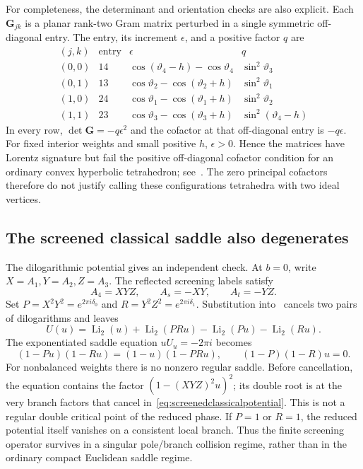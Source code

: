 \documentclass[11pt,a4paper]{article}
\numberwithin{equation}{section}
\theoremstyle{definition}
\theoremstyle{remark}
\begin{document}
For completeness, the determinant and orientation checks are
also explicit. Each $\mathbf G_{jk}$ is a planar rank-two
Gram matrix perturbed in a single symmetric off-diagonal entry.
The entry, its increment $\epsilon$, and a positive factor $q$
are
\[
\begin{array}{c|c|c|c}
(j,k)&\text{entry}&\epsilon&q\\ \hline
(0,0)&14&\cos(\vartheta_4-h)-\cos\vartheta_4&
                                      \sin^2\vartheta_3\\
(0,1)&13&\cos\vartheta_2-\cos(\vartheta_2+h)&
                                      \sin^2\vartheta_1\\
(1,0)&24&\cos\vartheta_1-\cos(\vartheta_1+h)&
                                      \sin^2\vartheta_2\\
(1,1)&23&\cos\vartheta_3-\cos(\vartheta_3+h)&
                                      \sin^2(\vartheta_4-h)
\end{array}
\]
In every row, $\det\mathbf G=-q\epsilon^2$ and the cofactor
at that off-diagonal entry is $-q\epsilon$. For fixed interior
weights and small positive $h$, $\epsilon>0$. Hence the matrices
have Lorentz signature but fail the positive off-diagonal
cofactor condition for an ordinary convex hyperbolic
tetrahedron; see~\cite[Theorem~2.1]{BellettiYang}.
The zero principal cofactors therefore do not justify calling
these configurations tetrahedra with two ideal vertices.

\subsection{The screened classical saddle also degenerates}

The dilogarithmic potential gives an independent check. At
$b=0$, write $X=A_1,Y=A_2,Z=A_3$. The reflected screening
labels satisfy
\[
 A_4=XYZ,\qquad A_s=-XY,\qquad A_t=-YZ.
\]
Set
$P=X^2Y^2=e^{2\pi i\delta_0}$ and
$R=Y^2Z^2=e^{2\pi i\delta_1}$.
Substitution into~\cite[eq.~(3.1)]{TeschnerVartanov} cancels
two pairs of dilogarithms and leaves
\begin{equation}
 U(u)=\operatorname{Li}_2(u)+\operatorname{Li}_2(PRu)
       -\operatorname{Li}_2(Pu)-\operatorname{Li}_2(Ru).
 \label{eq:screenedclassicalpotential}
\end{equation}
The exponentiated saddle equation $uU_u=-2\pi i$ becomes
\[
 (1-Pu)(1-Ru)=(1-u)(1-PRu),
 \qquad (1-P)(1-R)u=0.
\]
For nonbalanced weights there is no nonzero regular saddle.
Before cancellation, the equation contains the factor
$(1-(XYZ)^2u)^2$; its double root is at the very branch
factors that cancel in~\eqref{eq:screenedclassicalpotential}.
This is not a regular double critical point of the reduced
phase. If $P=1$ or $R=1$, the reduced potential itself vanishes
on a consistent local branch. Thus the finite screening
operator survives in a singular pole/branch collision regime,
rather than in the ordinary compact Euclidean saddle regime.
\end{document}
